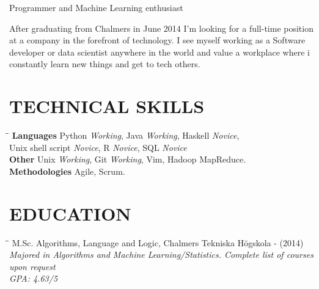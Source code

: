\documentclass[11pt]{res}
\begin{document}
 
$\:$ \\
\begin{resume}

 \centerline{{ \Large Programmer and Machine Learning enthusiast}}
After graduating from Chalmers in June 2014 I'm looking for a full-time position at a company in the forefront of technology. I see myself working as a Software developer or data scientist anywhere in the world and value a workplace where i constantly learn new things and get to tech others.

\section{TECHNICAL SKILLS}          
\vspace{-0.1in}	
	\begin{tabbing}
		\hspace{2.3in}\= \hspace{2.6in}\= \kill %
		{\bf Languages} \> Python { \small\textit{Working}}, Java { \small\textit{Working}}, Haskell { \small\textit{Novice}}, \\ \> Unix shell script { \small\textit{Novice}}, R { \small\textit{Novice}}, SQL { \small\textit{Novice}} \\
		{\bf Other} \> Unix { \small\textit{Working}}, Git { \small\textit{Working}}, Vim, Hadoop MapReduce.\\
		{\bf Methodologies} \> Agile, Scrum. 


	\end{tabbing}       

\section{EDUCATION}          
\vspace{-0.1in}	

	\begin{tabbing}
		\hspace{2.3in}\= \hspace{2.6in}\= \kill
		    M.Sc. Algorithms, Language and Logic, Chalmers Tekniska Högskola  \>  - (2014)\\
\textit{Majored in Algorithms and Machine Learning/Statistics. Complete list of courses upon request}  \\
\textit{GPA: 4.63/5 } \\
	\end{tabbing}


\end{resume}
\end{document}
